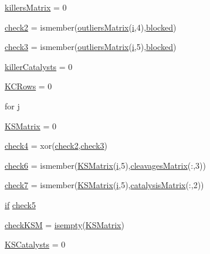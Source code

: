 \begin{DoxyCompactItemize}
\item 
\hyperlink{a00029_a929016802e1ede2217a41240a6974fa6}{killers\+Matrix} = 0
\item 
\hyperlink{a00029_a98a8838a85ed24032563a44271b1525a}{check2} = ismember(\hyperlink{a00030_a9733b61dd859b1133aa3aa849cf70cbc}{outliers\+Matrix}(\hyperlink{a00113_ad3efca1ea6e3333daf30719ee0501862}{i},4),\hyperlink{a00030_a1faaaae288fc8ca4ed1751049aa2f84f}{blocked})
\item 
\hyperlink{a00029_adfd17509248a56986475a25ee50fe488}{check3} = ismember(\hyperlink{a00030_a9733b61dd859b1133aa3aa849cf70cbc}{outliers\+Matrix}(\hyperlink{a00113_ad3efca1ea6e3333daf30719ee0501862}{i},5),\hyperlink{a00030_a1faaaae288fc8ca4ed1751049aa2f84f}{blocked})
\item 
\hyperlink{a00029_a1a42aaee01b2cc37a3835e0fe30cf9d3}{killer\+Catalysts} = 0
\item 
\hyperlink{a00029_a62227634d3ceda9bf932c630583da2b9}{K\+C\+Rows} = 0
\item 
for \hyperlink{a00029_ad34e9c7e9ae69ae0b9f1866faed5e4ad}{j}
\item 
\hyperlink{a00029_aea43faf8d3d68de03c645edc96b0c1c0}{K\+S\+Matrix} = 0
\item 
\hyperlink{a00029_ab21c5bac10f7ac73374c002e908df5ac}{check4} = xor(\hyperlink{a00030_a98a8838a85ed24032563a44271b1525a}{check2},\hyperlink{a00030_adfd17509248a56986475a25ee50fe488}{check3})
\item 
\hyperlink{a00029_a0c9b097ea561ab0f23a69197786a243a}{check6} = ismember(\hyperlink{a00030_ab18f9eabd5f873bd17d226d786bc22df}{K\+S\+Matrix}(\hyperlink{a00113_ad3efca1ea6e3333daf30719ee0501862}{i},5),\hyperlink{a00030_a90d1d83fdcae4fb1cba5129d5820d33c}{cleavages\+Matrix}(\+:,3))
\item 
\hyperlink{a00029_a0bbe7d2ceb7b248f0826d069d5a1b735}{check7} = ismember(\hyperlink{a00030_ab18f9eabd5f873bd17d226d786bc22df}{K\+S\+Matrix}(\hyperlink{a00113_ad3efca1ea6e3333daf30719ee0501862}{i},5),\hyperlink{a00030_a244eec8903103b5bbddef461276286ce}{catalysis\+Matrix}(\+:,2))
\item 
\hyperlink{a00030_a01d55766b8058903dd360b4bda71f9f5}{if} \hyperlink{a00029_abee07c73829351d18ba356c86e3e096d}{check5}
\item 
\hyperlink{a00029_a67eb148eecfd241148ce3711f058ac2b}{check\+K\+S\+M} = \hyperlink{a00025_ac10445404f4b83302522defb59e25ef7}{isempty}(\hyperlink{a00030_ab18f9eabd5f873bd17d226d786bc22df}{K\+S\+Matrix})
\item 
\hyperlink{a00029_a25c085d4378366ed81f0f97547802c8f}{K\+S\+Catalysts} = 0

\end{DoxyCompactItemize}

